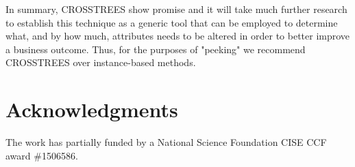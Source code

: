 \documentclass[conference]{IEEEtran}
\begin{document}
In summary, CROSSTREES show promise and it will take much further research to establish this technique as a generic tool that can be employed to determine what, and by how much, attributes needs to be altered in order to better improve a business outcome. Thus, for the purposes of "peeking" we recommend CROSSTREES over instance-based methods. 

\section*{Acknowledgments}

The work has partially funded by a National Science Foundation CISE CCF award \#1506586.



\end{document}

